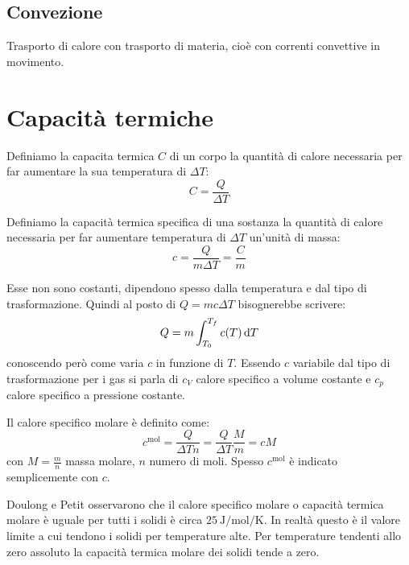 \subsection{Convezione}
Trasporto di calore con trasporto di materia, cioè con correnti convettive in movimento.


\section{Capacità termiche}
\begin{Def}
   Definiamo la capacita termica $C$ di un corpo la quantità di calore necessaria per far aumentare la sua temperatura di $\Delta T$:
   \begin{equation}
      C=\frac{Q}{\Delta T}
   \end{equation}
\end{Def}
\begin{Def}
   Definiamo la capacità termica specifica di una sostanza la quantità di calore necessaria per far aumentare  temperatura di $\Delta T$ un'unità di massa:
   \begin{equation}
      c=\frac{Q}{m\Delta T}=\frac{C}{m}
   \end{equation}
\end{Def}
Esse non sono costanti, dipendono spesso dalla temperatura e dal tipo di trasformazione. Quindi al posto di $Q=mc\Delta T$ bisognerebbe scrivere:
\begin{equation}
   Q=m\int_{T_0}^{T_f}c(T)\,\mathrm{d} T
\end{equation}
conoscendo però come varia $c$ in funzione di $T$. Essendo $c$ variabile dal tipo di trasformazione per i gas si parla di $c_V$ calore specifico a volume costante e $c_p$ calore specifico a pressione costante.
\begin{Def}
   Il calore specifico molare è definito come:
   \begin{equation}
      c^{\text{mol}}=\frac{Q}{\Delta T n}=\frac{Q}{\Delta T}\frac{M}{m}=cM
   \end{equation}
   con $M=\frac{m}{n}$ massa molare, $n$ numero di moli. Spesso $c^{\text{mol}}$ è indicato semplicemente con $c$.
\end{Def}

Doulong e Petit osservarono che il calore specifico molare o capacità termica molare è uguale per tutti i solidi è circa $\SI{25}{\joule\per\mole\per\kelvin}$. In realtà questo è il valore limite a cui tendono i solidi per temperature alte. Per temperature tendenti allo zero assoluto la capacità termica molare dei solidi tende a zero.


